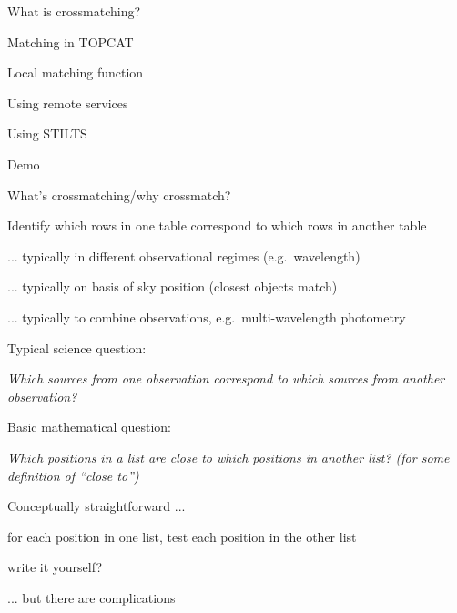 \documentclass[20pt,landscape]{foils}
\begin{document}
\begin{list1}
  \item What is crossmatching?
  \item Matching in TOPCAT
  \begin{list2big}
    \item Local matching function
    \item Using remote services
  \end{list2big}
  \item Using STILTS
  \item Demo
\end{list1}


\begin{list0}
  \item What's crossmatching/why crossmatch?
  \begin{list2}
    \item Identify which rows in one table correspond to
                   which rows in another table
    \item ... typically in different observational regimes (e.g.\ wavelength)
    \item ... typically on basis of sky position (closest objects match)
    \item ... typically to combine observations,
              e.g.\ multi-wavelength photometry
  \end{list2}
  \item Typical science question:
  \begin{list2big}
    \item[] {\color{darkred}\sl
             Which sources from one observation correspond to
             which sources from another observation?}
  \end{list2big}
  \item Basic mathematical question:
  \begin{list2big}
    \item[] {\color{darkred}\sl
             Which positions in a list are close to
             which positions in another list?
             (for some definition of ``close to'')}
  \end{list2big}
  \item Conceptually straightforward ...
  \begin{list2big}
    \item for each position in one list, test each position in the other list
    \item write it yourself?
  \end{list2big}
  \item ... but there are complications
\end{list0}
\end{document}

